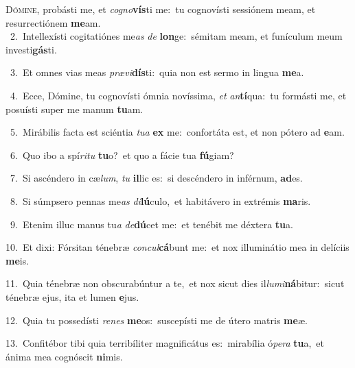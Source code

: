 \lettrine{\initial\textcolor{\initialcolor}{D}}{ómine,} probásti me, et \textit{co}\-\textit{gno}\textbf{vís}ti me:~\star tu cognovísti sessiónem meam, et resurrectiónem \textbf{me}\-am.\\
{\numbfont\textcolor{\numbcolor}{~2.}}~Intellexísti cogitatiónes me\textit{as} \textit{de} \textbf{lon}\-ge:~\star sémitam meam, et funículum meum investi\-\textbf{gás}\-ti.\par
{\numbfont\textcolor{\numbcolor}{~3.}}~Et omnes vias meas \textit{præ}\-\textit{vi}\textbf{dís}ti:~\star quia non est sermo in lingua \textbf{me}\-a.\par
{\numbfont\textcolor{\numbcolor}{~4.}}~Ecce, Dómine, tu cognovísti ómnia novíssima, \textit{et} \textit{an}\-\textbf{tí}qua:~\star tu formásti me, et posuísti super me manum \textbf{tu}\-am.\par
{\numbfont\textcolor{\numbcolor}{~5.}}~Mirábilis facta est sciéntia \textit{tu}\-\textit{a} \textbf{ex} me:~\star confortáta est, et non pótero ad \textbf{e}\-am.\par
{\numbfont\textcolor{\numbcolor}{~6.}}~Quo ibo a spí\-\textit{ri}\-\textit{tu} \textbf{tu}\-o?~\star et quo a fácie tua \textbf{fú}\-giam?\par
{\numbfont\textcolor{\numbcolor}{~7.}}~Si ascéndero in cæ\-\textit{lum}\-, \textit{tu} \textbf{il}\-lic es:~\star si descéndero in inférnum, \textbf{ad}\-es.\par
{\numbfont\textcolor{\numbcolor}{~8.}}~Si súmpsero pennas me\textit{as} \textit{di}\-\textbf{lú}culo,~\star et habitávero in extrémis \textbf{ma}\-ris.\par
{\numbfont\textcolor{\numbcolor}{~9.}}~Etenim illuc manus tu\textit{a} \textit{de}\-\textbf{dú}cet me:~\star et tenébit me déxtera \textbf{tu}\-a.\par
{\numbfont\textcolor{\numbcolor}{10.}}~Et dixi: Fórsitan ténebræ \textit{con}\-\textit{cul}\textbf{cá}bunt me:~\star et nox illuminátio mea in delíciis \textbf{me}\-is.\par
{\numbfont\textcolor{\numbcolor}{11.}}~Quia ténebræ non obscurabúntur a te,~\dagger et nox sicut dies il\-\textit{lu}\-\textit{mi}\textbf{ná}bitur:~\star sicut ténebræ ejus, ita et lumen \textbf{e}\-jus.\par
{\numbfont\textcolor{\numbcolor}{12.}}~Quia tu possedísti \textit{re}\-\textit{nes} \textbf{me}\-os:~\star suscepísti me de útero matris \textbf{me}\-æ.\par
{\numbfont\textcolor{\numbcolor}{13.}}~Confitébor tibi quia terribíliter magnificátus es:~\dagger mirabília ó\-\textit{pe}\-\textit{ra} \textbf{tu}\-a,~\star et ánima mea cognóscit \textbf{ni}\-mis.\par
